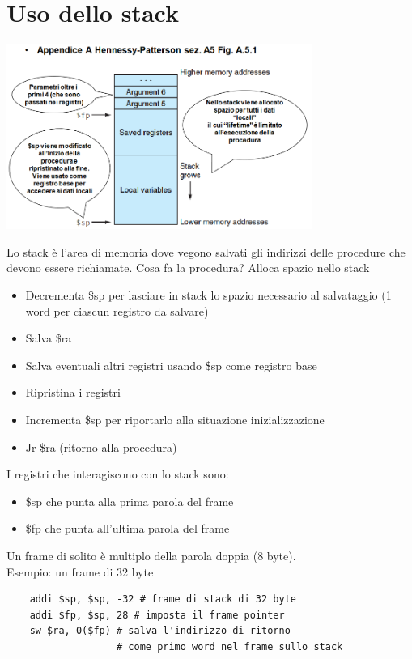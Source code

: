 \documentclass[12pt, a4paper, openany]{book}
\begin{document}
\section{Uso dello stack}
\begin{center}
    \includegraphics[width=100mm, scale=0.5]{uso dello stack.png}
\end{center}
Lo stack è l'area di memoria dove vegono salvati gli indirizzi delle procedure che devono
essere richiamate.
Cosa fa la procedura? Alloca spazio nello stack
\begin{itemize}
    \item Decrementa \$sp per lasciare in stack lo spazio necessario al salvataggio (1 word
    per ciascun registro da salvare)
    \item Salva \$ra
    \item Salva eventuali altri registri usando \$sp come registro base
    \item Ripristina i registri
    \item Incrementa \$sp per riportarlo alla situazione inizializzazione
    \item Jr \$ra (ritorno alla procedura)
\end{itemize}

I registri che interagiscono con lo stack sono: \begin{itemize}
    \item \$sp che punta alla prima parola del frame
    \item \$fp che punta all'ultima parola del frame
\end{itemize}
Un frame di solito è multiplo della parola doppia (8 byte).
\\Esempio: un frame di 32 byte
\begin{lstlisting}
    addi $sp, $sp, -32 # frame di stack di 32 byte
    addi $fp, $sp, 28 # imposta il frame pointer
    sw $ra, 0($fp) # salva l'indirizzo di ritorno 
                   # come primo word nel frame sullo stack
\end{lstlisting}
\end{document}
